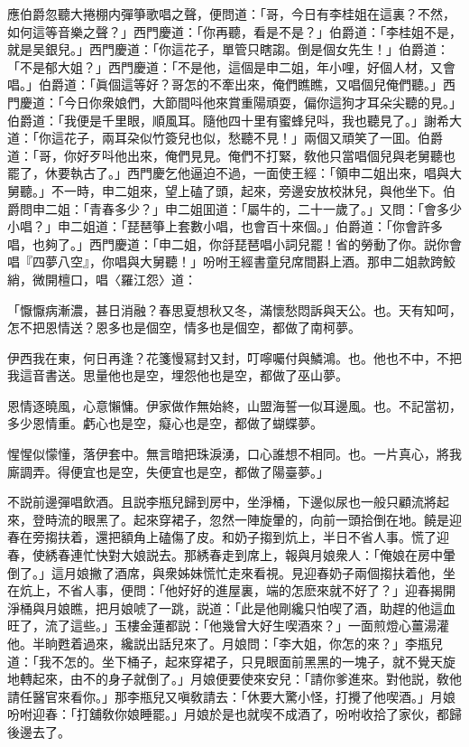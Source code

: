 應伯爵忽聽大捲棚内彈箏歌唱之聲，便問道：「哥，今日有李桂姐在這裏？不然，如何這等音樂之聲？」西門慶道：「你再聽，看是不是？」伯爵道：「李桂姐不是，就是吴銀兒。」西門慶道：「你這花子，單管只瞎謅。倒是個女先生！」伯爵道：「不是郁大姐？」西門慶道：「不是他，這個是申二姐，年小哩，好個人材，又會唱。」伯爵道：「眞個這等好？哥怎的不牽出來，俺們瞧瞧，又唱個兒俺們聽。」西門慶道：「今日你衆娘們，大節間呌他來賞重陽頑耍，偏你這狗才耳朵尖聽的見。」伯爵道：「我便是千里眼，順風耳。隨他四十里有蜜蜂兒呌，我也聽見了。」謝希大道：「你這花子，兩耳朶似竹簽兒也似，愁聽不見！」兩個又頑笑了一囬。伯爵道：「哥，你好歹呌他出來，俺們見見。俺們不打緊，敎他只當唱個兒與老舅聽也罷了，休要執古了。」西門慶乞他逼迫不過，一面使王經：「領申二姐出來，唱與大舅聽。」不一時，申二姐來，望上磕了頭，起來，旁邊安放校牀兒，與他坐下。伯爵問申二姐：「青春多少？」申二姐囬道：「屬牛的，二十一歲了。」又問：「會多少小唱？」申二姐道：「琵琶箏上套數小唱，也會百十來個。」伯爵道：「你會許多唱，也夠了。」西門慶道：「申二姐，你㧱琵琶唱小詞兒罷！省的勞動了你。説你會唱『四夢八空』，你唱與大舅聽！」吩咐王經書童兒席間斟上酒。那申二姐款跨鮫綃，微開檀口，唱〈羅江怨〉道：

「懨懨病漸濃，甚日消融？春思夏想秋又冬，滿懷愁悶訴與天公。也。天有知呵，怎不把恩情送？恩多也是個空，情多也是個空，都做了南柯夢。

伊西我在東，何日再逢？花箋慢冩封又封，叮嚀囑付與鱗鴻。也。他也不中，不把我這音書送。思量他也是空，埋怨他也是空，都做了巫山夢。

恩情逐曉風，心意懶慵。伊家做作無始終，山盟海誓一似耳邊風。也。不記當初，多少恩情重。虧心也是空，癡心也是空，都做了蝴蝶夢。

惺惺似懞懂，落伊套中。無言暗把珠淚湧，口心誰想不相同。也。一片真心，將我廝調弄。得便宜也是空，失便宜也是空，都做了陽臺夢。」

不説前邊彈唱飲酒。且説李瓶兒歸到房中，坐淨桶，下邊似尿也一般只顧流將起來，登時流的眼黑了。起來穿裙子，忽然一陣旋暈的，向前一頭拾倒在地。饒是迎春在旁搊扶着，還把額角上磕傷了皮。和奶子搊到炕上，半日不省人事。慌了迎春，使綉春連忙快對大娘説去。那綉春走到席上，報與月娘衆人：「俺娘在房中暈倒了。」這月娘撇了酒席，與衆姊妹慌忙走來看視。見迎春奶子兩個搊扶着他，坐在炕上，不省人事，便問：「他好好的進屋裏，端的怎麽來就不好了？」迎春揭開淨桶與月娘瞧，把月娘唬了一跳，説道：「此是他剛纔只怕喫了酒，助趕的他這血旺了，流了這些。」玉樓金蓮都説：「他幾曾大好生喫酒來？」一面煎燈心薑湯灌他。半晌甦着過來，纔説出話兒來了。月娘問：「李大姐，你怎的來？」李瓶兒道：「我不怎的。坐下桶子，起來穿裙子，只見眼面前黑黑的一塊子，就不覺天旋地轉起來，由不的身子就倒了。」月娘便要使來安兒：「請你爹進來。對他説，敎他請任醫官來看你。」那李瓶兒又嗔敎請去：「休要大驚小怪，打攪了他喫酒。」月娘吩咐迎春：「打舖敎你娘睡罷。」月娘於是也就喫不成酒了，吩咐收拾了家伙，都歸後邊去了。

